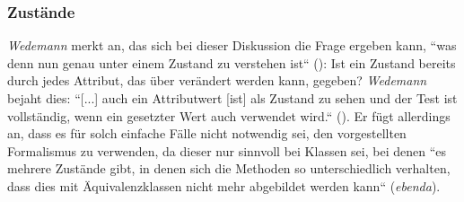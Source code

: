 \subsubsection*{Zustände}
\textit{Wedemann} merkt an, das sich bei dieser Diskussion die Frage ergeben kann, ``was denn nun genau unter einem Zustand zu verstehen ist`` (\cite[48]{Wed09c}): Ist ein Zustand bereits durch jedes Attribut, das über  verändert werden kann, gegeben? \textit{Wedemann} bejaht dies: ``[...] auch ein Attributwert [ist] als Zustand zu sehen und der Test ist vollständig, wenn ein gesetzter Wert auch verwendet wird.`` (\cite[48]{Wed09c}).
Er fügt allerdings an, dass es für solch einfache Fälle nicht notwendig sei, den vorgestellten Formalismus zu verwenden, da dieser nur sinnvoll bei Klassen sei, bei denen ``es mehrere Zustände gibt, in denen sich die Methoden so unterschiedlich verhalten, dass dies mit Äquivalenzklassen nicht mehr abgebildet werden kann`` (\textit{ebenda}).